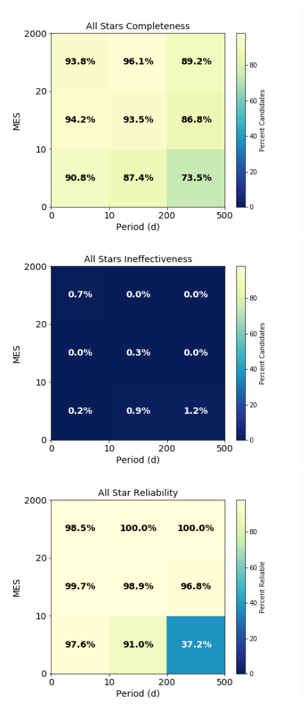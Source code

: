 \begin{figure}[ht]
\begin{center}
\includegraphics[width=0.93\linewidth]{fig-AllCompletePmes.png}
\includegraphics[width=0.93\linewidth]{fig-AllEffect-Pmes.png}
\includegraphics[width=0.93\linewidth]{fig-AllReliabilityPmes.png}

\end{center}
\end{figure}
